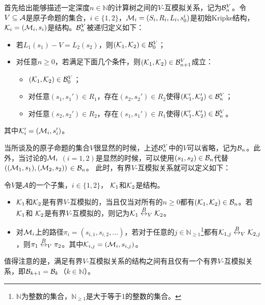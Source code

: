 首先给出能够描述一定深度$n\in \mathbb{N}$的计算树之间的$V$-互模拟关系，记为${\cal B}_n^V$。令$V\subseteq {\cal A}$是原子命题的集合，$i\in \{1,2\}$，${\cal M}_i=(S_i,R_i,L_i,s_0^i)$是初始Kripke结构，${\cal K}_i=({\cal M}_i, s_i)$是结构。${\cal B}_n^V$被递归定义如下：
\begin{itemize}
	\item 若$L_1(s_1)-V=L_2(s_2)$，则$({\cal K}_1,{\cal K}_2) \in {\cal B}_0^V$；
	\item 对任意$n\ge 0$，若满足下面几个条件，则$({\cal K}_1,{\cal K}_2)\in {\cal B}_{n+1}^V$成立：
	\begin{itemize}
		\item $({\cal K}_1,{\cal K}_2) \in {\cal B}_0^V$；
		\item 对任意$(s_1,s_1')\in R_1$，存在$(s_2,s_2')\in R_2$使得$({\cal K}_1',{\cal K}_2') \in {\cal B}_n^V$；
		\item 对任意$(s_2,s_2')\in R_2$，存在$(s_1,s_1')\in R_1$使得$({\cal K}_1',{\cal K}_2') \in {\cal B}_n^V$。
	\end{itemize}
\end{itemize}
其中${\cal K}_i'=({\cal M}_i,s_i')$。

当所谈及的原子命题的集合$V$很显然的时候，上述${\cal B}_n^V$中的$V$可以省略，记为${\cal B}_n$。此外，当讨论的${\cal M}_i$ $(i=1,2)$是显然的时候，可以使用$(s_1,s_2) \in {\cal B}_n$代替$(({\cal M}_1,s_1),({\cal M}_2,s_2))$ $\in {\cal B}_n$。
此时，有界$V$-互模拟关系就可以定义如下：
\begin{definition}[有界$V$-互模拟]\label{def:V-bisimulation}
	令$V$是${\cal A}$的一个子集，$i\in \{1,2\}$， ${\cal K}_1$和${\cal K}_2$是结构。
	\begin{itemize}
		\item ${\cal K}_1$和${\cal K}_2$是有界$V$-互模拟的，当且仅当对所有的$n \ge 0$都有$({\cal K}_1, {\cal K}_2)\in {\cal B}_n$。若 ${\cal K}_1$和 ${\cal K}_2$是有界$V$-互模拟的，则记为${\cal K}_1 \overset{B}{\leftrightarrow}_V {\cal K}_2$。
		\item 对${\cal M}_i$上的路径$\pi_i=(s_{i,1},s_{i,2},\dots)$，若对于任意的$j\in \mathbb{N}_{\ge 1}$\footnote{$\mathbb{N}$为整数的集合，$\mathbb{N}_{\ge 1}$是大于等于1的整数的集合。}都有${\cal K}_{1,j} \overset{B}{\leftrightarrow}_V {\cal K}_{2,j}$，则$\pi_1 \overset{B}{\leftrightarrow}_V \pi_2$。其中${\cal K}_{i, j}=({\cal M}_i, s_{i,j})$。
	\end{itemize}
\end{definition}

值得注意的是，满足有界$V$-互模拟关系的结构之间有且仅有一个有界$V$-互模拟关系，即${\cal B}_{k+1} = {\cal B}_k$（$k \in \mathbb{N}$）。


